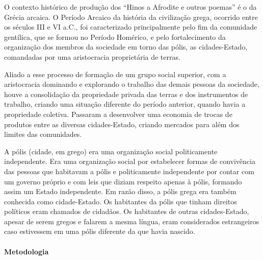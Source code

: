 \documentclass[12pt]{extarticle}
\begin{document}
O contexto histórico de produção dos ``Hinos a Afrodite e outros poemas'' 
é o da Grécia arcaica. O Período Arcaico da história da civilização grega, 
ocorrido entre os séculos \textsc{III} e \textsc{VI} a.C., foi caracterizado 
principalmente pelo fim da comunidade gentílica, que se formou no Período 
Homérico, e pelo fortalecimento da organização dos membros da sociedade em 
torno das pólis, as cidades-Estado, comandadas por uma aristocracia proprietária de terras.

Aliado a esse processo de formação de um grupo social superior, com a aristocracia 
dominando e explorando o trabalho das demais pessoas da sociedade, houve a consolidação 
da propriedade privada das terras e dos instrumentos de trabalho, criando uma situação 
diferente do período anterior, quando havia a propriedade coletiva. Passaram a desenvolver 
uma economia de trocas de produtos entre as diversas cidades-Estado, criando mercados para 
além dos limites das comunidades.

A pólis (cidade, em grego) era uma organização social politicamente independente. 
Era uma organização social por estabelecer formas de convivência das pessoas que 
habitavam a pólis e politicamente independente por contar com um governo próprio 
e com leis que diziam respeito apenas à pólis, formando assim um Estado independente. 
Em razão disso, a pólis grega era também conhecida como cidade-Estado. Os habitantes 
da pólis que tinham direitos políticos eram chamados de cidadãos. Os habitantes de outras 
cidades-Estado, apesar de serem gregos e falarem a mesma língua, eram considerados 
estrangeiros caso estivessem em uma pólis diferente da que havia nascido.

\paragraph{Metodologia}
\end{document}
